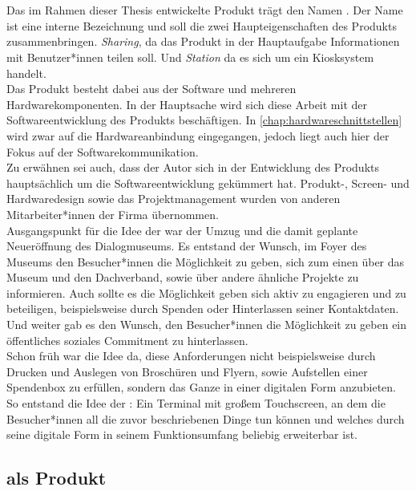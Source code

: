 \section{\shst{}}
\label{sec:sharing-station}

Das im Rahmen dieser Thesis entwickelte Produkt trägt den Namen \shst{}. Der Name 
ist eine interne Bezeichnung und soll die zwei Haupteigenschaften des Produkts zusammenbringen.
\emph{Sharing}, da das Produkt in der Hauptaufgabe Informationen mit Benutzer*innen teilen soll. 
Und \emph{Station} da es sich um ein Kiosksystem handelt.\\

Das Produkt besteht dabei aus der Software und mehreren Hardwarekomponenten. In der Hauptsache
wird sich diese Arbeit mit der Softwareentwicklung des Produkts beschäftigen. In \autoref{chap:hardwareschnittstellen} 
wird zwar auf die Hardwareanbindung eingegangen, jedoch liegt auch hier der Fokus auf der Softwarekommunikation.\\
Zu erwähnen sei auch, dass der Autor sich in der Entwicklung des Produkts hauptsächlich um die Softwareentwicklung 
gekümmert hat. Produkt-, Screen- und Hardwaredesign sowie das Projektmanagement wurden von anderen Mitarbeiter*innen
der Firma \meso{} übernommen.\\

Ausgangspunkt für die Idee der \shst{} war der Umzug und die damit geplante Neueröffnung des Dialogmuseums.
Es entstand der Wunsch, im Foyer des Museums den Besucher*innen die Möglichkeit zu geben, sich zum einen 
über das Museum und den Dachverband, sowie über andere ähnliche Projekte zu informieren. Auch sollte
es die Möglichkeit geben sich aktiv zu engagieren und zu beteiligen, beispielsweise durch Spenden oder 
Hinterlassen seiner Kontaktdaten. Und weiter gab es den Wunsch, den Besucher*innen die Möglichkeit zu geben ein 
öffentliches soziales Commitment zu hinterlassen.\\
Schon früh war die Idee da, diese Anforderungen nicht beispielsweise durch Drucken und Auslegen von 
Broschüren und Flyern, sowie Aufstellen einer Spendenbox zu erfüllen, sondern das Ganze in einer digitalen
Form anzubieten. So entstand die Idee der \shst{}: Ein Terminal mit großem Touchscreen, an dem die Besucher*innen 
all die zuvor beschriebenen Dinge tun können und welches durch seine digitale Form in seinem Funktionsumfang
beliebig erweiterbar ist.

\subsection{\shst{} als Produkt}
\label{subs:sharing-station-produkt}

